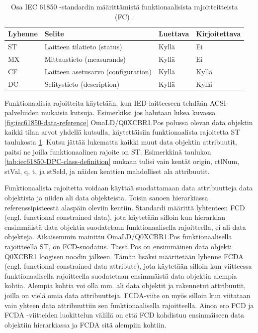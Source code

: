\begin{table}[ht!]
	\caption{Osa IEC 61850 -standardin määrittämistä funktionaalisista rajoitteitteista (FC) \cite[s.~54]{IEC61850-7-2}.}
	\label{tab:iec61850-functional-constraints}
	\begin{tabular}{l | l | l | l}
		\hline
		\textbf{Lyhenne} & \textbf{Selite} & \textbf{Luettava} & \textbf{Kirjoitettava} \\
		\hline \hline
		ST & Laitteen tilatieto (status) & Kyllä & Ei \\
		MX & Mittaustieto (measurands) & Kyllä & Ei \\
		CF & Laitteen asetusarvo (configuration) & Kyllä & Kyllä \\
		DC & Selitystieto (description) & Kyllä & Kyllä \\
		\hline
	\end{tabular}
\end{table}

Funktionaalisia rajoitteita käytetään, kun IED-laitteeseen tehdään ACSI-palveluiden mukaisia kutsuja. Esimerkiksi jos halutaan lukea kuvassa \ref{fig:iec61850-data-reference} OmaLD/Q0XCBR1.Pos polussa olevan data objektin kaikki tilan arvot yhdellä kutsulla, käytettäisiin funktionaalista rajoitetta ST taulukosta \ref{tab:iec61850-functional-constraints}. Kutsu jättää lukematta kaikki muut data objektin attribuutit, paitsi ne joilla funktionaalinen rajoite on ST. Esimerkkinä taulukon \ref{tab:iec61850-DPC-class-definition} mukaan tulisi vain kentät origin, ctlNum, stVal, q, t, ja stSeld, ja näiden kenttien mahdolliset ala attribuutit.

Funktionaalista rajoitetta voidaan käyttää suodattamaan data attribuutteja data objektista ja niiden ali data objekteista. Toisin sanoen hierarkiassa referenssipisteestä alaspäin oleviin kentiin. Standardi määrittä lyhtenteen FCD (engl. functional constrained data), jota käytetään silloin kun hierarkian ensimmäistä data objektia suodatetaan funktionaalisella rajoitteella, ei ali data objekteja. Aikaisemmin mainittu OmaLD/Q0XCBR1.Pos funktionaalisella rajoitteella ST, on FCD-suodatus. Tässä Pos on ensimmäinen data objekti Q0XCBR1 loogisen noodin jälkeen. Tämän lisäksi määritetään lyhenne FCDA (engl. functional constrained data attribute), jota käytetään silloin kun viitteessa funktionaalisella rajoitteella suodatetaan ensimmäistä data objektia alempia kohtia. Alempia kohtia voi olla mm. ali data objektit ja rakennetut attribuutit, joilla on vielä omia data attribuutteja. FCDA-viite on myös silloin kun viitataan vain yhteen data attribuuttiin sen funktionaalisella rajoitteella. Ainoa ero FCD ja FCDA -viitteiden luokittelun välillä on että FCD kohdistuu ensinmäiseen data objektiin hierarkiassa ja FCDA sitä alempiin kohtiin. \cite[s.~55]{IEC61850-7-2} \cite[s.~63]{IEC61850-8-1}

